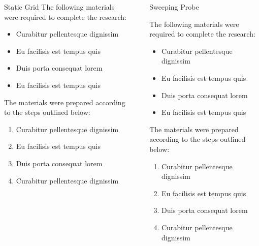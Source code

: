 \documentclass[final]{beamer}
\newlength{\sepwid}
\newlength{\onecolwid}
\begin{document}
\begin{frame}[t]
\begin{columns}[t]
\begin{column}{\onecolwid}
\begin{block}{Static Grid}
	The following materials were required to complete the research:
	
	\begin{itemize}
	\item Curabitur pellentesque dignissim
	\item Eu facilisis est tempus quis
	\item Duis porta consequat lorem
	\item Eu facilisis est tempus quis
	\end{itemize}
	
	The materials were prepared according to the steps outlined below:
	
	\begin{enumerate}
	\item Curabitur pellentesque dignissim
	\item Eu facilisis est tempus quis
	\item Duis porta consequat lorem
	\item Curabitur pellentesque dignissim
	\end{enumerate}
	
	\end{block}
\end{column}
\begin{column}{\sepwid}\end{column} %
\begin{column}{\onecolwid}
\begin{block}{Sweeping Probe}
		
	The following materials were required to complete the research:
	
	\begin{itemize}
		\item Curabitur pellentesque dignissim
		\item Eu facilisis est tempus quis
		\item Duis porta consequat lorem
		\item Eu facilisis est tempus quis
	\end{itemize}
	
	The materials were prepared according to the steps outlined below:
	
	\begin{enumerate}
		\item Curabitur pellentesque dignissim
		\item Eu facilisis est tempus quis
		\item Duis porta consequat lorem
		\item Curabitur pellentesque dignissim
	\end{enumerate}
	

\end{block}
\end{column}
\end{columns}
\end{frame}
\end{document}
